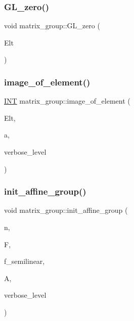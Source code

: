 \subsubsection{\texorpdfstring{G\+L\+\_\+zero()}{GL\_zero()}}
{\footnotesize\ttfamily void matrix\+\_\+group\+::\+G\+L\+\_\+zero (\begin{DoxyParamCaption}\item[{\mbox{\hyperlink{galois_8h_a09fddde158a3a20bd2dcadb609de11dc}{I\+NT}} $\ast$}]{Elt }\end{DoxyParamCaption})}

\mbox{\label{classmatrix__group_abe0e1b5d8d046f05b8d3eaa72a9d4036}} 
\subsubsection{\texorpdfstring{image\+\_\+of\+\_\+element()}{image\_of\_element()}}
{\footnotesize\ttfamily \mbox{\hyperlink{galois_8h_a09fddde158a3a20bd2dcadb609de11dc}{I\+NT}} matrix\+\_\+group\+::image\+\_\+of\+\_\+element (\begin{DoxyParamCaption}\item[{\mbox{\hyperlink{galois_8h_a09fddde158a3a20bd2dcadb609de11dc}{I\+NT}} $\ast$}]{Elt,  }\item[{\mbox{\hyperlink{galois_8h_a09fddde158a3a20bd2dcadb609de11dc}{I\+NT}}}]{a,  }\item[{\mbox{\hyperlink{galois_8h_a09fddde158a3a20bd2dcadb609de11dc}{I\+NT}}}]{verbose\+\_\+level }\end{DoxyParamCaption})}

\mbox{\label{classmatrix__group_aa278bd127d400940516c20bfe1f2f91e}} 
\subsubsection{\texorpdfstring{init\+\_\+affine\+\_\+group()}{init\_affine\_group()}}
{\footnotesize\ttfamily void matrix\+\_\+group\+::init\+\_\+affine\+\_\+group (\begin{DoxyParamCaption}\item[{\mbox{\hyperlink{galois_8h_a09fddde158a3a20bd2dcadb609de11dc}{I\+NT}}}]{n,  }\item[{\mbox{\hyperlink{classfinite__field}{finite\+\_\+field}} $\ast$}]{F,  }\item[{\mbox{\hyperlink{galois_8h_a09fddde158a3a20bd2dcadb609de11dc}{I\+NT}}}]{f\+\_\+semilinear,  }\item[{\mbox{\hyperlink{classaction}{action}} $\ast$}]{A,  }\item[{\mbox{\hyperlink{galois_8h_a09fddde158a3a20bd2dcadb609de11dc}{I\+NT}}}]{verbose\+\_\+level }\end{DoxyParamCaption})}

